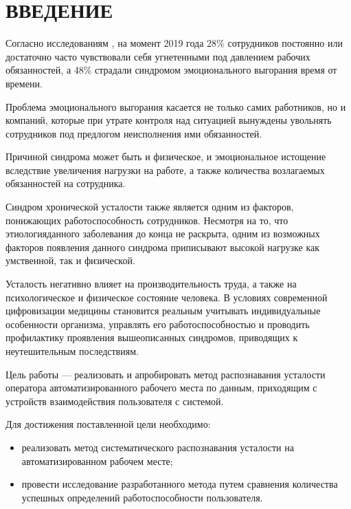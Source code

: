 \section*{ВВЕДЕНИЕ}

Согласно исследованиям \cite{burnout}, на момент 2019 года 28\% сотрудников постоянно или достаточно часто чувствовали себя угнетенными под давлением рабочих обязанностей, а 48\% страдали синдромом эмоционального выгорания время от времени.

Проблема эмоционального выгорания касается не только самих работников, но и компаний, которые при утрате контроля над ситуацией вынуждены увольнять сотрудников под предлогом неисполнения ими обязанностей. \cite{CompanyProblem}

Причиной синдрома может быть и физическое, и эмоциональное истощение вследствие увеличения нагрузки на работе, а также количества возлагаемых обязанностей на сотрудника. \cite{Prichini}

Синдром хронической усталости также является одним из факторов, понижающих работоспособность сотрудников. Несмотря на то, что этиология\newline данного заболевания до конца не раскрыта, одним из возможных факторов появления данного синдрома приписывают высокой нагрузке как умственной, так и физической. \cite{SHU}

Усталость негативно влияет на производительность труда, а также на психологическое и физическое состояние человека. В условиях современной цифровизации медицины становится реальным учитывать индивидуальные особенности организма, управлять его работоспособностью и проводить профилактику проявления вышеописанных синдромов, приводящих к неутешительным последствиям.

Цель работы --- реализовать и апробировать метод распознавания усталости оператора автоматизированного рабочего места по данным, приходящим с устройств взаимодействия пользователя с системой.

Для достижения поставленной цели необходимо:
\begin{itemize}
	\item реализовать метод систематического распознавания усталости на автоматизированном рабочем месте;
	\item провести исследование разработанного метода путем сравнения количества успешных определений работоспособности пользователя.
\end{itemize}

\pagebreak